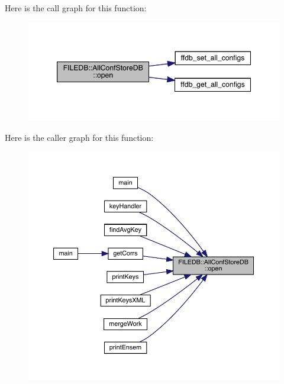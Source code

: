 Here is the call graph for this function\+:
\nopagebreak
\begin{figure}[H]
\begin{center}
\leavevmode
\includegraphics[width=347pt]{df/db6/classFILEDB_1_1AllConfStoreDB_aa6e6deb3c33076d16db4ac0560f0d75f_cgraph}
\end{center}
\end{figure}
Here is the caller graph for this function\+:
\nopagebreak
\begin{figure}[H]
\begin{center}
\leavevmode
\includegraphics[width=350pt]{df/db6/classFILEDB_1_1AllConfStoreDB_aa6e6deb3c33076d16db4ac0560f0d75f_icgraph}
\end{center}
\end{figure}
\mbox{\label{classFILEDB_1_1AllConfStoreDB_aa6e6deb3c33076d16db4ac0560f0d75f}} 
